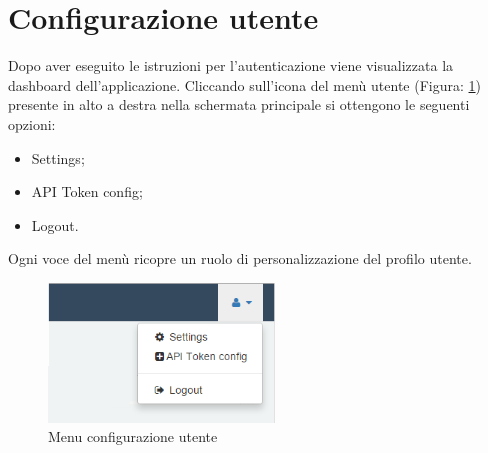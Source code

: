 %

\section{Configurazione utente} %
\label{sec:configurazione_utente}
	Dopo aver eseguito le istruzioni per l'autenticazione viene visualizzata la dashboard dell’applicazione.\newline
	Cliccando sull'icona del menù utente (Figura: \ref{fig:menu_configurazione_utente}) presente in alto a destra nella schermata principale si ottengono le seguenti opzioni:
	\begin{itemize}
		\item Settings;
		\item API Token config;
		\item Logout.
	\end{itemize}
	Ogni voce del menù ricopre un ruolo di personalizzazione del profilo utente.
	\begin{figure}[H]
		\centering
		\centerline{\includegraphics[width=6cm]{images/menu_configurazione_utente.png}}
		\caption{Menu configurazione utente}
		\label{fig:menu_configurazione_utente}
	\end{figure}


	\pagebreak
